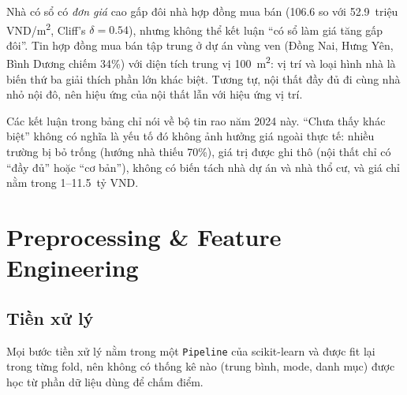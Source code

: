 \documentclass[11pt]{article}
\newcommand{\ty}{tỷ VND}
\newcommand{\trm}{triệu VND/m\textsuperscript{2}}
\newcommand{\mtwo}{m\textsuperscript{2}}
\begin{document}
\begin{warnbox}
Nhà có sổ có \textit{đơn giá} cao gấp đôi nhà hợp đồng mua bán (106.6 so với 52.9~\trm, Cliff's $\delta = 0.54$),
nhưng không thể kết luận ``có sổ làm giá tăng gấp đôi''. Tin hợp đồng mua bán tập trung ở dự án vùng ven
(Đồng Nai, Hưng Yên, Bình Dương chiếm 34\%) với diện tích trung vị 100~\mtwo: vị trí và loại hình nhà là biến
thứ ba giải thích phần lớn khác biệt. Tương tự, nội thất đầy đủ đi cùng nhà nhỏ nội đô, nên hiệu ứng của
nội thất lẫn với hiệu ứng vị trí.

Các kết luận trong bảng chỉ nói về bộ tin rao năm 2024 này. ``Chưa thấy khác biệt'' không có nghĩa là yếu tố đó
không ảnh hưởng giá ngoài thực tế: nhiều trường bị bỏ trống (hướng nhà thiếu 70\%), giá trị được ghi thô (nội thất
chỉ có ``đầy đủ'' hoặc ``cơ bản''), không có biến tách nhà dự án và nhà thổ cư, và giá chỉ nằm trong 1--11.5~\ty.
\end{warnbox}

\section{Preprocessing \& Feature Engineering}

\subsection{Tiền xử lý}

Mọi bước tiền xử lý nằm trong một \texttt{Pipeline} của scikit-learn và được fit lại trong từng fold, nên
không có thống kê nào (trung bình, mode, danh mục) được học từ phần dữ liệu dùng để chấm điểm.
\end{document}
